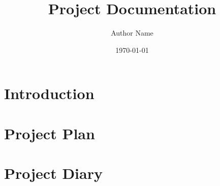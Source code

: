 \documentclass{article}
\title{Project Documentation}
\author{Author Name}
\date{\today}
\begin{document}
\maketitle

\section{Introduction}


\section{Project Plan}


\section{Project Diary}

\end{document}
